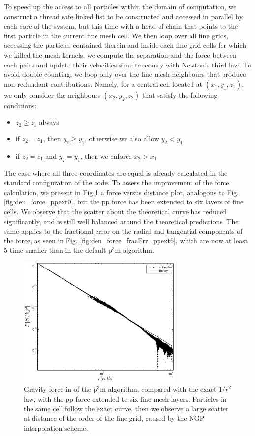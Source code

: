  To speed up the access to all particles within the domain of computation, we construct a thread safe linked list
 to be constructed and accessed in parallel by each core of the system, but this time with a head-of-chain that points to the first particle in the current fine mesh cell. We then loop over all fine grids, accessing the particles contained therein and inside each fine grid cells for which we killed the mesh kernels,
 we compute the separation and the force between each pairs and update their velocities simultaneously with Newton's third law. 
 To avoid double counting, we loop only over the fine mesh neighbours that produce non-redundant contributions. Namely, for a central cell located at 
 $(x_1, y_1, z_1)$, we only consider the neighbours $(x_2, y_2, z_2)$ that satisfy the following conditions:
 \begin{itemize}
 \item{$z_2 \ge z_1$ always}
 \item{if $z_2 = z_1$, then $y_2 \ge y_1$, otherwise we also allow $y_2 < y_1$} 
 \item{if $z_2 = z_1$ and $y_2 = y_1$, then we enforce $x_2 > x_1$}
 \end{itemize}
 The case where all three coordinates are equal is already calculated in the standard configuration of the code.
 To assess the improvement of the force calculation, we present in Fig \ref{fig:den_force_ppext6} a force versus distance
 plot, analogous to Fig. \ref{fig:den_force_ppext0}, but the pp force has been extended to six layers of fine cells. 
 We observe that the scatter about the theoretical curve has reduced significantly, and is still well balanced around the theoretical predictions.
 The same applies to the fractional error on the radial and tangential components of the force, as seen in Fig. \ref{fig:den_force_fracErr_ppext6},
 which are now at least 5 time smaller than in the default p$^{3}$m algorithm.
 
 \begin{figure}%
  \begin{center}
    \includegraphics[width=3.2in]{graphs/densityForce_ppext=6.eps}
  \caption{Gravity force in of the p$^3$m algorithm, compared with the exact $1/r^{2}$ law,
  with the pp force extended to six fine mesh layers.
  Particles in the same cell follow the exact curve, then we observe a large scatter at 
  distance of the order of the fine grid, caused by the NGP interpolation scheme. 
    \label{fig:den_force_ppext6}}
\end{center}
\end{figure}


